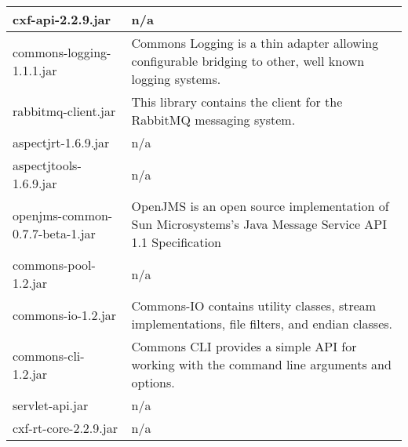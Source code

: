 \begin{center}
\begin{longtable}{|p{}|p{}|}
\hline 
cxf-api-2.2.9.jar & n/a\\
\hline 
commons-logging-1.1.1.jar & Commons Logging is a thin adapter allowing configurable bridging to other, well known logging systems.\\
\hline 
rabbitmq-client.jar & This library contains the client for the RabbitMQ messaging system.\\
\hline 
aspectjrt-1.6.9.jar & n/a\\
\hline 
aspectjtools-1.6.9.jar & n/a\\
\hline 
openjms-common-0.7.7-beta-1.jar & OpenJMS is an open source implementation of Sun Microsystems's Java Message Service API 1.1 Specification\\
\hline 
commons-pool-1.2.jar & n/a\\
\hline 
commons-io-1.2.jar & Commons-IO contains utility classes, stream implementations, file filters, and endian classes.\\
\hline 
commons-cli-1.2.jar & Commons CLI provides a simple API for working with the command line arguments and options.\\
\hline 
servlet-api.jar & n/a\\
\hline 
cxf-rt-core-2.2.9.jar & n/a\\
\hline 
\end{longtable}
\label{tabular:libraries}
\end{center}
